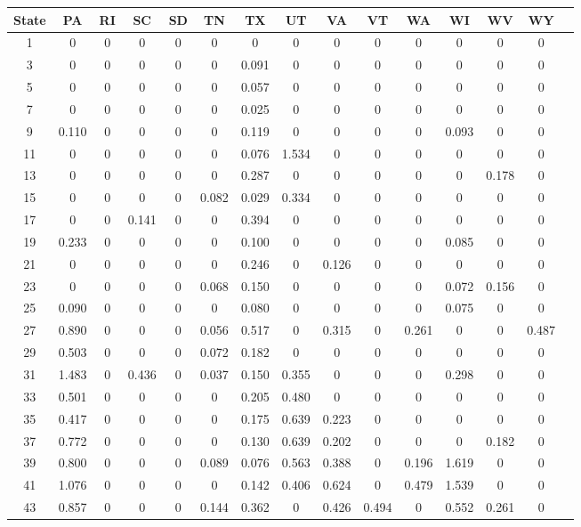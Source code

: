 \begin{table*}[htb]
\footnotesize
    \centering
    \begin{tabular}{|c |c |c |c |c |c |c |c |c |c |c |c |c |c |c|}\hline
        \textbf{State} & \textbf{PA}& \textbf{RI}& \textbf{SC}& \textbf{SD}& \textbf{TN}& \textbf{TX}& \textbf{UT}& \textbf{VA}& \textbf{VT}& \textbf{WA}& \textbf{WI}& \textbf{WV}& \textbf{WY} \\\hline
    1&0& 0& 0& 0& 0& 0& 0& 0& 0& 0& 0& 0& 0\\\hline
3&0& 0& 0& 0& 0& 0.091& 0& 0& 0& 0& 0& 0& 0\\\hline
5&0& 0& 0& 0& 0& 0.057& 0& 0& 0& 0& 0& 0& 0\\\hline
7&0& 0& 0& 0& 0& 0.025& 0& 0& 0& 0& 0& 0& 0\\\hline
9&0.110& 0& 0& 0& 0& 0.119& 0& 0& 0& 0& 0.093& 0& 0\\\hline
11&0& 0& 0& 0& 0& 0.076& 1.534& 0& 0& 0& 0& 0& 0\\\hline
13&0& 0& 0& 0& 0& 0.287& 0& 0& 0& 0& 0& 0.178& 0\\\hline
15&0& 0& 0& 0& 0.082& 0.029& 0.334& 0& 0& 0& 0& 0& 0\\\hline
17&0& 0& 0.141& 0& 0& 0.394& 0& 0& 0& 0& 0& 0& 0\\\hline
19&0.233& 0& 0& 0& 0& 0.100& 0& 0& 0& 0& 0.085& 0& 0\\\hline
21&0& 0& 0& 0& 0& 0.246& 0& 0.126& 0& 0& 0& 0& 0\\\hline
23&0& 0& 0& 0& 0.068& 0.150& 0& 0& 0& 0& 0.072& 0.156& 0\\\hline
25&0.090& 0& 0& 0& 0& 0.080& 0& 0& 0& 0& 0.075& 0& 0\\\hline
27&0.890& 0& 0& 0& 0.056& 0.517& 0& 0.315& 0& 0.261& 0& 0& 0.487\\\hline
29&0.503& 0& 0& 0& 0.072& 0.182& 0& 0& 0& 0& 0& 0& 0\\\hline
31&1.483& 0& 0.436& 0& 0.037& 0.150& 0.355& 0& 0& 0& 0.298& 0& 0\\\hline
33&0.501& 0& 0& 0& 0& 0.205& 0.480& 0& 0& 0& 0& 0& 0\\\hline
35&0.417& 0& 0& 0& 0& 0.175& 0.639& 0.223& 0& 0& 0& 0& 0\\\hline
37&0.772& 0& 0& 0& 0& 0.130& 0.639& 0.202& 0& 0& 0& 0.182& 0\\\hline
39&0.800& 0& 0& 0& 0.089& 0.076& 0.563& 0.388& 0& 0.196& 1.619& 0& 0\\\hline
41&1.076& 0& 0& 0& 0& 0.142& 0.406& 0.624& 0& 0.479& 1.539& 0& 0\\\hline
43&0.857& 0& 0& 0& 0.144& 0.362& 0& 0.426& 0.494& 0& 0.552& 0.261& 0\\\hline

\end{tabular}
\end{table*}
